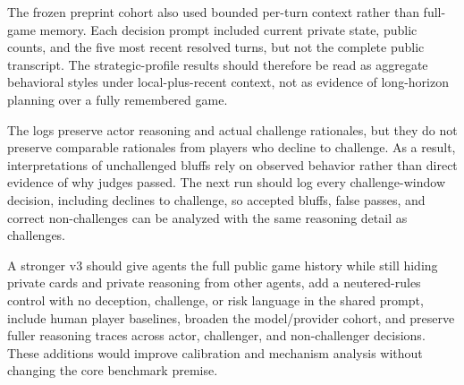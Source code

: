 The frozen preprint cohort also used bounded per-turn context rather than full-game memory. Each decision prompt included current private state, public counts, and the five most recent resolved turns, but not the complete public transcript. The strategic-profile results should therefore be read as aggregate behavioral styles under local-plus-recent context, not as evidence of long-horizon planning over a fully remembered game.

The logs preserve actor reasoning and actual challenge rationales, but they do not preserve comparable rationales from players who decline to challenge. As a result, interpretations of unchallenged bluffs rely on observed behavior rather than direct evidence of why judges passed. The next run should log every challenge-window decision, including declines to challenge, so accepted bluffs, false passes, and correct non-challenges can be analyzed with the same reasoning detail as challenges.

A stronger v3 should give agents the full public game history while still hiding private cards and private reasoning from other agents, add a neutered-rules control with no deception, challenge, or risk language in the shared prompt, include human player baselines, broaden the model/provider cohort, and preserve fuller reasoning traces across actor, challenger, and non-challenger decisions. These additions would improve calibration and mechanism analysis without changing the core benchmark premise.
